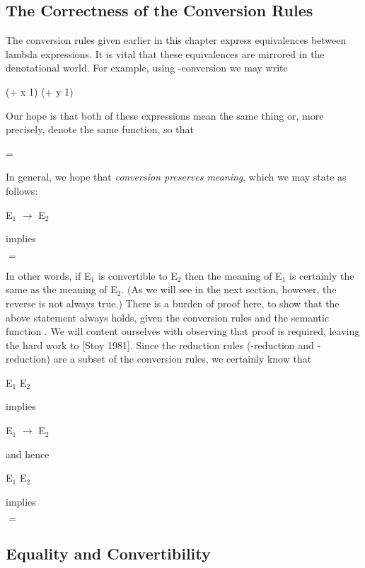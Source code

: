 \subsection{The Correctness of the Conversion Rules}

The conversion rules given earlier in this chapter express equivalences
between lambda expressions. It is vital that these equivalences are mirrored in
the denotational world. For example, using \ta-conversion we may write
\begin{mlcoded}
    (+ x 1) \conversion{\alpha} (+ y 1)
\end{mlcoded}
Our hope is that both of these expressions mean the same thing or, more
precisely, denote the same function, so that
\begin{mlcoded}
     = 
\end{mlcoded}
In general, we hope that \textit{conversion preserves meaning}, which we may state
as follows:
\begin{mlcoded}
    E$_1$ $\rightarrow$ E$_2$
\end{mlcoded}
implies
\begin{mlcoded}
     $=$ 
\end{mlcoded}
In other words, if E$_1$ is convertible to E$_2$ then the meaning of E$_1$ is certainly the
same as the meaning of E$_2$. (As we will see in the next section, however, the
reverse is not always true.) There is a burden of proof here, to show that the
above statement always holds, given the conversion rules and the semantic
function \eval. We will content ourselves with observing that proof is required,
leaving the hard work to [Stoy 1981].
Since the reduction rules (\tb-reduction and \te-reduction) are a subset of the
conversion rules, we certainly know that
\begin{mlcoded}
    E$_1$ \reduction{\beta} E$_2$
\end{mlcoded}
implies
\begin{mlcoded}
    E$_1$ $\rightarrow$ E$_2$
\end{mlcoded}
and hence
\begin{mlcoded}
    E$_1$ \reduction{\beta} E$_2$
\end{mlcoded}
implies
\begin{mlcoded}
     $=$ 
\end{mlcoded}

\subsection{Equality and Convertibility}

